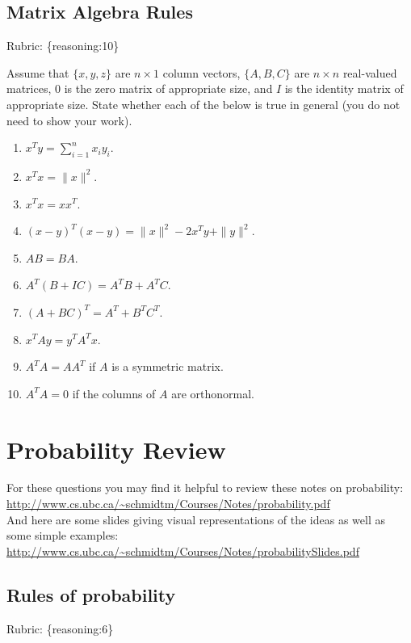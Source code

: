 \documentclass{article}
\def\rubric#1{\gre{Rubric: \{#1\}}}{}
\def\blu#1{{\color{blu}#1}}
\def\gre#1{{\color{gre}#1}}
\def\red#1{{\color{red}#1}}
\def\ans#1{{\color{ans}#1}}
\def\norm#1{\|#1\|}
\begin{document}
\subsection{Matrix Algebra Rules}
\rubric{reasoning:10}

Assume that $\{x,y,z\}$ are $n \times 1$ column vectors, $\{A,B,C\}$ are $n \times n$ real-valued matrices, \red{$0$ is the zero matrix of appropriate size}, and $I$ is the identity matrix of appropriate size. \blu{State whether each of the below is true in general} (you do not need to show your work).
\begin{enumerate}
\item $x^Ty = \sum_{i=1}^n x_iy_i$. \ans{}
\item $x^Tx = \norm{x}^2$. \ans{}
\item $x^Tx = xx^T$. \ans{}
\item $(x-y)^T(x-y) = \norm{x}^2 - 2x^Ty + \norm{y}^2$. \ans{}
\item $AB=BA$. \ans{\fbox{false}}
\item $A^T(B + IC) = A^TB + A^TC$. \ans{}
\item $(A + BC)^T = A^T + B^TC^T$. \ans{}
\item $x^TAy = y^TA^Tx$. \ans{}
\item $A^TA = AA^T$ if $A$ is a symmetric matrix. \ans{}
\item $A^TA = 0$ if the columns of $A$ are orthonormal. \ans{}
\end{enumerate}

\section{Probability Review}


For these questions you may find it helpful to review these notes on probability:\\
\url{http://www.cs.ubc.ca/~schmidtm/Courses/Notes/probability.pdf}\\
And here are some slides giving visual representations of the ideas as well as some simple examples:\\
\url{http://www.cs.ubc.ca/~schmidtm/Courses/Notes/probabilitySlides.pdf}

\subsection{Rules of probability}
\rubric{reasoning:6}
\end{document}
